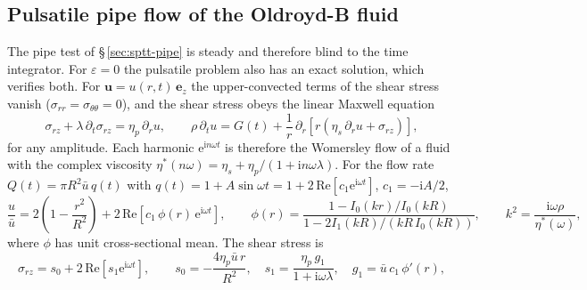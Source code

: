 
\subsection{Pulsatile pipe flow of the Oldroyd-B fluid}\label{sec:womersley-ob}

The pipe test of \S\,\ref{sec:sptt-pipe} is steady and therefore blind to the
time integrator. For $\varepsilon=0$ the pulsatile problem also has an exact
solution, which verifies both. For $\boldsymbol{u}=u(r,t)\,\boldsymbol{e}_z$
the upper-convected terms of the shear stress vanish
($\sigma_{rr}=\sigma_{\theta\theta}=0$), and the shear stress obeys the linear
Maxwell equation
\begin{equation}
  \sigma_{rz} + \lambda\,\partial_t\sigma_{rz} = \eta_p\,\partial_r u ,
  \qquad
  \rho\,\partial_t u = G(t) + \frac1r\,\partial_r\!\left[r\left(\eta_s\,\partial_r u
    + \sigma_{rz}\right)\right],
  \label{eq:ob-shear}
\end{equation}
for any amplitude. Each harmonic $\mathrm{e}^{\mathrm{i}n\omega t}$ is
therefore the Womersley flow of a fluid with the complex viscosity
$\eta^\ast(n\omega)=\eta_s+\eta_p/(1+\mathrm{i}n\omega\lambda)$. For the flow
rate $Q(t)=\pi R^2\bar u\,q(t)$ with $q(t)=1+A\sin\omega t
=1+2\,\mathrm{Re}[c_1\mathrm{e}^{\mathrm{i}\omega t}]$, $c_1=-\mathrm{i}A/2$,
\begin{equation}
  \frac{u}{\bar u} = 2\left(1-\frac{r^2}{R^2}\right)
    + 2\,\mathrm{Re}\!\left[c_1\,\phi(r)\,\mathrm{e}^{\mathrm{i}\omega t}\right],
  \qquad
  \phi(r) = \frac{1-I_0(kr)/I_0(kR)}{1-2I_1(kR)/\left(kR\,I_0(kR)\right)},
  \qquad
  k^2=\frac{\mathrm{i}\omega\rho}{\eta^\ast(\omega)},
  \label{eq:womersley-u}
\end{equation}
where $\phi$ has unit cross-sectional mean. The shear stress is
\begin{equation}
  \sigma_{rz} = s_0 + 2\,\mathrm{Re}\!\left[s_1\mathrm{e}^{\mathrm{i}\omega t}\right],
  \qquad
  s_0=-\frac{4\eta_p\bar u\,r}{R^2},\quad
  s_1=\frac{\eta_p\,g_1}{1+\mathrm{i}\omega\lambda},\quad
  g_1=\bar u\,c_1\,\phi'(r),
  \label{eq:womersley-s}
\end{equation}
